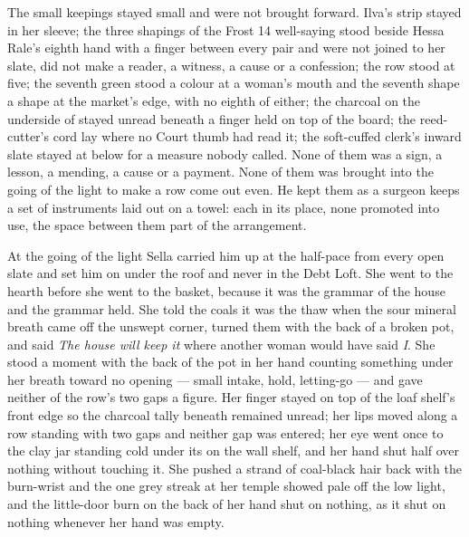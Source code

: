 The small keepings stayed small and were not brought forward. Ilva's strip stayed in her sleeve; the three shapings of the Frost 14 well-saying stood beside Hessa Rale's eighth hand with a finger between every pair and were not joined to her slate, did not make a reader, a witness, a cause or a confession; the row stood at five; the seventh green stood a colour at a woman's mouth and the seventh shape a shape at the market's edge, with no eighth of either; the charcoal on the underside of  stayed unread beneath a finger held on top of the board; the reed-cutter's cord lay where no Court thumb had read it; the soft-cuffed clerk's inward slate stayed at  below  for a measure nobody called. None of them was a sign, a lesson, a mending, a cause or a payment. None of them was brought into the going of the light to make a row come out even. He kept them as a surgeon keeps a set of instruments laid out on a towel: each in its place, none promoted into use, the space between them part of the arrangement.

\scenebreak

At the going of the light Sella carried him up at the half-pace from every open slate and set him on  under the roof and never in the Debt Loft. She went to the hearth before she went to the basket, because it was the grammar of the house and the grammar held. She told the coals it was the thaw when the sour mineral breath came off the unswept corner, turned them with the back of a broken pot, and said \emph{The house will keep it} where another woman would have said \emph{I}. She stood a moment with the back of the pot in her hand counting something under her breath toward no opening --- small intake, hold, letting-go --- and gave neither of the row's two gaps a figure. Her finger stayed on top of the loaf shelf's front edge so the charcoal tally beneath remained unread; her lips moved along a row standing with two gaps and neither gap was entered; her eye went once to the clay jar standing cold under its  on the wall shelf, and her hand shut half over nothing without touching it. She pushed a strand of coal-black hair back with the burn-wrist and the one grey streak at her temple showed pale off the low light, and the little-door burn on the back of her hand shut on nothing, as it shut on nothing whenever her hand was empty.

